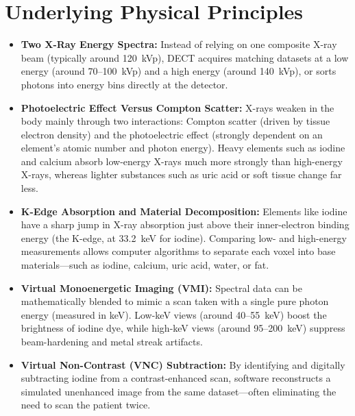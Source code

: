 \section{Underlying Physical Principles}
\begin{itemize}
\item \textbf{Two X-Ray Energy Spectra:} Instead of relying on one composite X-ray beam (typically around 120~kVp), DECT acquires matching datasets at a low energy (around 70--100~kVp) and a high energy (around 140~kVp), or sorts photons into energy bins directly at the detector.
\item \textbf{Photoelectric Effect Versus Compton Scatter:} X-rays weaken in the body mainly through two interactions: Compton scatter (driven by tissue electron density) and the photoelectric effect (strongly dependent on an element's atomic number and photon energy). Heavy elements such as iodine and calcium absorb low-energy X-rays much more strongly than high-energy X-rays, whereas lighter substances such as uric acid or soft tissue change far less.
\item \textbf{K-Edge Absorption and Material Decomposition:} Elements like iodine have a sharp jump in X-ray absorption just above their inner-electron binding energy (the K-edge, at 33.2~keV for iodine). Comparing low- and high-energy measurements allows computer algorithms to separate each voxel into base materials---such as iodine, calcium, uric acid, water, or fat.
\item \textbf{Virtual Monoenergetic Imaging (VMI):} Spectral data can be mathematically blended to mimic a scan taken with a single pure photon energy (measured in keV). Low-keV views (around 40--55~keV) boost the brightness of iodine dye, while high-keV views (around 95--200~keV) suppress beam-hardening and metal streak artifacts.
\item \textbf{Virtual Non-Contrast (VNC) Subtraction:} By identifying and digitally subtracting iodine from a contrast-enhanced scan, software reconstructs a simulated unenhanced image from the same dataset---often eliminating the need to scan the patient twice.
\end{itemize}

